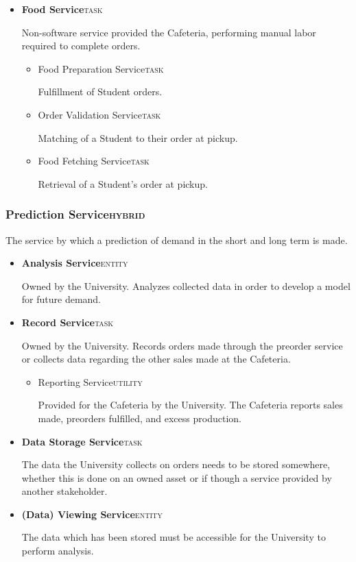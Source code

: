 \documentclass[11pt]{article}
\begin{document}
\begin{itemize}
\item \textbf{Food Service}\hfill{}\textsc{task}
\label{sec:org33b9d83}

Non-software service provided the Cafeteria, performing manual
labor required to complete orders.

\begin{itemize}
\item Food Preparation Service\hfill{}\textsc{task}
\label{sec:orgfd8ead6}

Fulfillment of Student orders.

\item Order Validation Service\hfill{}\textsc{task}
\label{sec:org059598d}

Matching of a Student to their order at pickup.

\item Food Fetching Service\hfill{}\textsc{task}
\label{sec:orgd99e9d4}

Retrieval of a Student's order at pickup.
\end{itemize}
\end{itemize}

\subsubsection*{Prediction Service\hfill{}\textsc{hybrid}}
\label{sec:orgbed4167}
The service by which a prediction of demand in the short and long
term is made.
\begin{itemize}
\item \textbf{Analysis Service}\hfill{}\textsc{entity}
\label{sec:org486ba32}

Owned by the University. Analyzes collected data in order to
develop a model for future demand.

\item \textbf{Record Service}\hfill{}\textsc{task}
\label{sec:org6927859}

Owned by the University. Records orders made through the preorder
service or collects data regarding the other sales made at the
Cafeteria.

\begin{itemize}
\item Reporting Service\hfill{}\textsc{utility}
\label{sec:org03016ec}

Provided for the Cafeteria by the University. The Cafeteria
reports sales made, preorders fulfilled, and excess production.
\end{itemize}

\item \textbf{Data Storage Service}\hfill{}\textsc{task}
\label{sec:org0324616}

The data the University collects on orders needs to be stored
somewhere, whether this is done on an owned asset or if though a
service provided by another stakeholder.

\item \textbf{(Data) Viewing Service}\hfill{}\textsc{entity}
\label{sec:org956f6eb}

The data which has been stored must be accessible for the
University to perform analysis.
\end{itemize}
\end{document}
